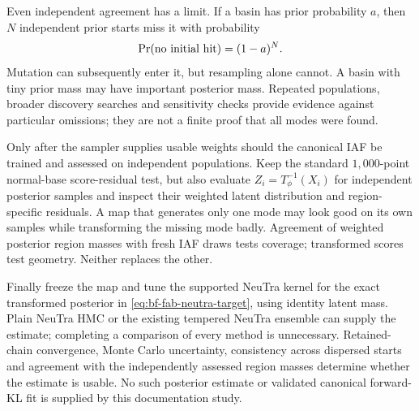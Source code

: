 Even independent agreement has a limit. If a basin has prior probability
$a$, then $N$ independent prior starts miss it with probability
\begin{equation}
 \Pr(\hbox{no initial hit})=(1-a)^N.
 \label{eq:bf-is-missing-basin}
\end{equation}
Mutation can subsequently enter it, but resampling alone cannot. A basin
with tiny prior mass may have important posterior mass. Repeated populations,
broader discovery searches and sensitivity checks provide evidence against
particular omissions; they are not a finite proof that all modes were found.

Only after the sampler supplies usable weights should the canonical IAF be
trained and assessed on independent populations. Keep the standard
$1{,}000$-point normal-base score-residual test, but also evaluate
$Z_i=T_\phi^{-1}(X_i)$ for independent posterior samples and inspect their
weighted latent distribution and region-specific residuals. A map that
generates only one mode may look good on its own samples while transforming
the missing mode badly. Agreement of weighted posterior region masses with
fresh IAF draws tests coverage; transformed scores test geometry. Neither
replaces the other.

Finally freeze the map and tune the supported NeuTra kernel for the exact
transformed posterior in \eqref{eq:bf-fab-neutra-target}, using identity
latent mass. Plain NeuTra HMC or the existing tempered NeuTra ensemble can
supply the estimate; completing a comparison of every method is unnecessary.
Retained-chain convergence, Monte Carlo uncertainty, consistency across
dispersed starts and agreement with the independently assessed region masses
determine whether the estimate is usable. No such posterior estimate or
validated canonical forward-KL fit is supplied by this documentation study.
